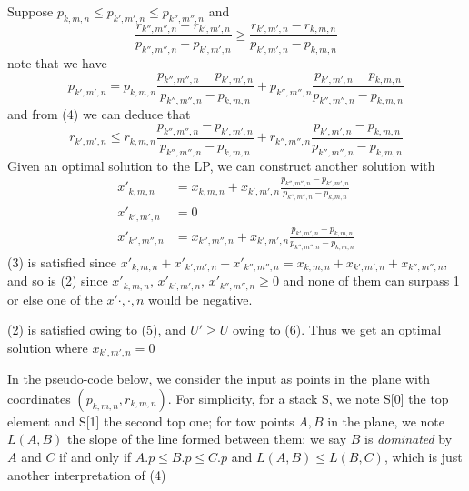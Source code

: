 \documentclass[11pt, oneside]{report}
\begin{document}
Suppose $p_{k,m,n}\le p_{k',m',n}\le p_{k'',m'',n}$ and
\begin{equation}
\frac{r_{k'',m'',n}-r_{k',m',n}}{p_{k'',m'',n}-p_{k',m',n}}\ge\frac{r_{k',m',n}-r_{k,m,n}}{p_{k',m',n}-p_{k,m,n}}
\end{equation}
note that we have
\begin{equation}
p_{k',m',n}=p_{k,m,n}\frac{p_{k'',m'',n}-p_{k',m',n}}{p_{k'',m'',n}-p_{k,m,n}}+p_{k'',m'',n}\frac{p_{k',m',n}-p_{k,m,n}}{p_{k'',m'',n}-p_{k,m,n}}
\end{equation}
and from (4) we can deduce that
\begin{equation}
r_{k',m',n}\le r_{k,m,n}\frac{p_{k'',m'',n}-p_{k',m',n}}{p_{k'',m'',n}-p_{k,m,n}}+r_{k'',m'',n}\frac{p_{k',m',n}-p_{k,m,n}}{p_{k'',m'',n}-p_{k,m,n}}
\end{equation}
Given an optimal solution to the LP, we can construct another solution with
\begin{align*}
x'_{k,m,n}&=x_{k,m,n}+x_{k',m',n}\frac{p_{k'',m'',n}-p_{k',m',n}}{p_{k'',m'',n}-p_{k,m,n}}\\
x'_{k',m',n}&=0\\
x'_{k'',m'',n}&=x_{k'',m'',n}+x_{k',m',n}\frac{p_{k',m',n}-p_{k,m,n}}{p_{k'',m'',n}-p_{k,m,n}}
\end{align*}
(3) is satisfied since $x'_{k,m,n}+x'_{k',m',n}+x'_{k'',m'',n}=x_{k,m,n}+x_{k',m',n}+x_{k'',m'',n}$, and so is (2) since $x'_{k,m,n},\,x'_{k',m',n},\,x'_{k'',m'',n}\ge0$ and none of them can surpass 1 or else one of the $x'{\cdot,\cdot,n}$ would be negative.

(2) is satisfied owing to (5), and $U'\ge U$ owing to (6). Thus we get an optimal solution where $x_{k',m',n}=0$

In the pseudo-code below, we consider the input as points in the plane with coordinates $(p_{k,m,n},r_{k,m,n})$. For simplicity, for a stack S, we note S[0] the top element and S[1] the second top one; for tow points $A,B$ in the plane, we note $L(A,B)$ the slope of the line formed between them; we say $B$ is \emph{dominated} by $A$ and $C$ if and only if $A.p\le B.p\le C.p$ and $L(A,B)\le L(B,C)$, which is just another interpretation of (4)

\hspace{1em}
\end{document}
